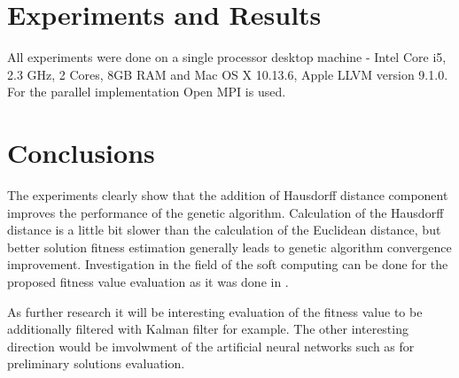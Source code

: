 \documentclass[runningheads]{llncs}
\begin{document}
\section{Experiments and Results}

All experiments were done on a single processor desktop machine - Intel Core i5, 2.3 GHz, 2 Cores, 8GB RAM and Mac OS X 10.13.6, Apple LLVM version 9.1.0. For the parallel implementation Open MPI is used.

\section{Conclusions}

The experiments clearly show that the addition of Hausdorff distance component improves the performance of the genetic algorithm. Calculation of the Hausdorff distance is a little bit slower than the calculation of the Euclidean distance, but better solution fitness estimation generally leads to genetic algorithm convergence improvement. Investigation in the field of the soft computing can be done for the proposed fitness value evaluation as it was done in \cite{angelova01}.

As further research it will be interesting evaluation of the fitness value to be additionally filtered with Kalman filter \cite{alexandrov01} for example. The other interesting direction would be imvolwment of the artificial neural networks such as \cite{tashev01,atanasova01} for preliminary solutions evaluation.
\end{document}
